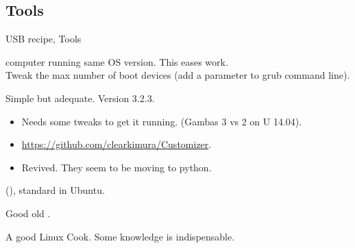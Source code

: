 \subsection{Tools}
\begin{frame}{USB recipe, Tools}
  \begin{description}[short]
  \item[Host] computer running same OS version. This eases work.\\
    Tweak
    the max number of boot devices (add a parameter to grub command line).
  \item[Customizer] Simple but adequate. Version 3.2.3.
    \begin{itemize}
    \item Needs some tweaks to get it running. (Gambas 3 vs 2 on U 14.04).
    \item \url{https://github.com/clearkimura/Customizer}.
    \item Revived. They seem to be moving to python.
    \end{itemize}
  \item[Startup Disk Creator] (),
    standard in Ubuntu.
  \item[DD] Good old .
  \item[Cook] A good Linux Cook\InlineSmiley. Some knowledge is indispensable.
  \end{description}
\end{frame}

